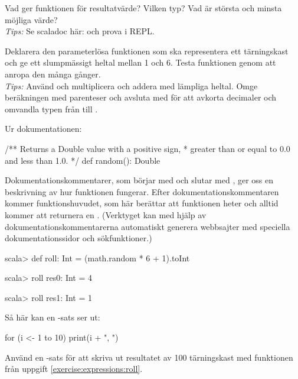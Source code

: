 \QUESTEND



\QUESTBEGIN

\Task\label{exercise:expressions:roll} \what

\Subtask Vad ger funktionen  för resultatvärde? Vilken typ? Vad är största och minsta möjliga värde?
\\\emph{Tips:} Se scaladoc här: \Scaladoc och prova i REPL.

\Subtask Deklarera den parameterlösa funktionen  som ska representera ett tärningskast och ge ett slumpmässigt heltal mellan 1 och 6. Testa funktionen genom att anropa den många gånger. \\\emph{Tips:} Använd  och multiplicera och addera med lämpliga heltal. Omge beräkningen med parenteser och avsluta med  för att avkorta decimaler och omvandla typen från  till .

\SOLUTION

\TaskSolved \what

\SubtaskSolved Ur dokumentationen:
\begin{Code}
/** Returns a Double value with a positive sign,
 *  greater than or equal to 0.0 and less than 1.0.
 */
def random(): Double
\end{Code}
Dokumentationskommentarer, som börjar med \code{/**} och slutar med \code{*/}, ger oss en beskrivning av hur funktionen fungerar. Efter dokumentationskommentaren kommer funktionshuvudet, som här berättar att funktionen heter  och alltid kommer att returnera en . (Verktyget  kan med hjälp av  dokumentationskommentarerna automatiskt generera webbsajter med speciella  dokumentationssidor och sökfunktioner.)

\SubtaskSolved
\begin{REPL}
scala> def roll: Int = (math.random * 6 + 1).toInt

scala> roll
res0: Int = 4

scala> roll
res1: Int = 1
\end{REPL}

\QUESTEND





\QUESTBEGIN

\Task \what

\Subtask Så här kan en -sats ser ut:
\begin{Code}
for (i <- 1 to 10) print(i + ", ")
\end{Code}
Använd en -sats för att skriva ut resultatet av 100 tärningskast med funktionen  från uppgift \ref{exercise:expressions:roll}.

